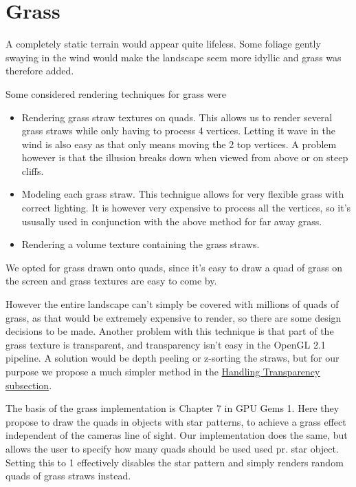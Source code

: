 \chapter{Grass}


A completely static terrain would appear quite lifeless. Some foliage
gently swaying in the wind would make the landscape seem more idyllic
and grass was therefore added.

Some considered rendering techniques for grass were

\begin{itemize}
\item Rendering grass straw textures on quads. This allows us to
  render several grass straws while only having to process 4
  vertices. Letting it wave in the wind is also easy as that only
  means moving the 2 top vertices. A problem however is that the
  illusion breaks down when viewed from above or on steep cliffs.
\item Modeling each grass straw. This technigue allows for very
  flexible grass with correct lighting. It is however very expensive
  to process all the vertices, so it's ususally used in conjunction
  with the above method for far away grass.
\item Rendering a volume texture containing the grass straws.
\end{itemize}

We opted for grass drawn onto quads, since it's easy to draw a quad of
grass on the screen and grass textures are easy to come by.

However the entire landscape can't simply be covered with millions of
quads of grass, as that would be extremely expensive to render, so
there are some design decisions to be made. Another problem with this
technique is that part of the grass texture is transparent, and
transparency isn't easy in the OpenGL 2.1 pipeline. A solution would
be depth peeling or z-sorting the straws, but for our purpose we
propose a much simpler method in the
\hyperref[sec:transparency]{Handling Transparency subsection}.


The basis of the grass implementation is Chapter 7 in GPU Gems 1. Here
they propose to draw the quads in objects with star patterns, to
achieve a grass effect independent of the cameras line of sight. Our
implementation does the same, but allows the user to specify how many
quads should be used used pr. star object. Setting this to 1
effectively disables the star pattern and simply renders random quads
of grass straws instead.

